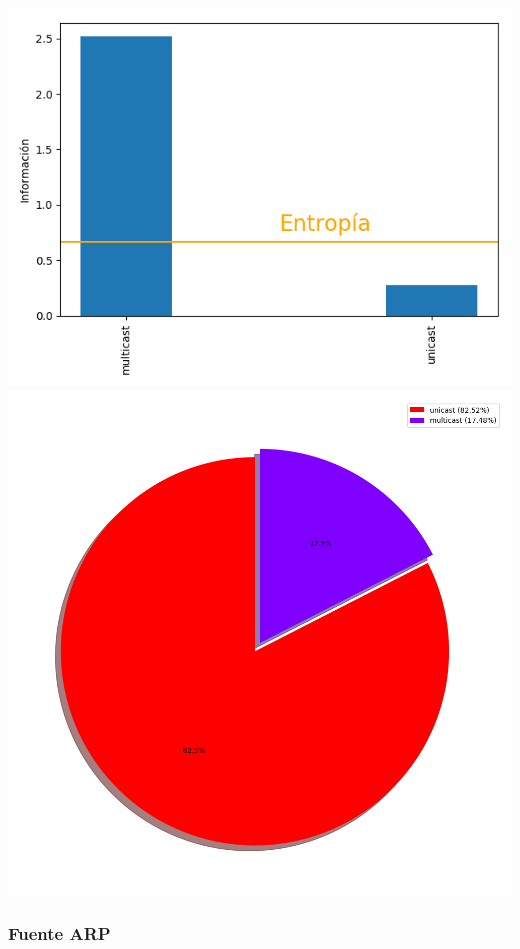 \hspace*{-1.5cm}
 \includegraphics[scale=0.6]{../plots/labos_s1_informacion.png}
 \includegraphics[scale=0.4]{../plots/labos_s1_probabilidades.png}

\subsubsection{Fuente ARP}

